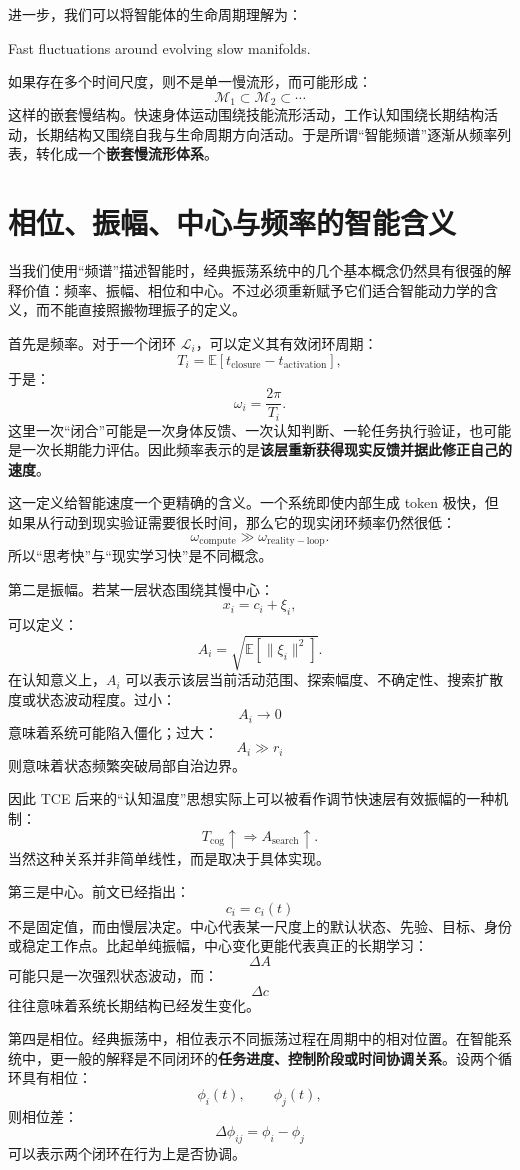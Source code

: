 进一步，我们可以将智能体的生命周期理解为：
\begin{statementbox}
Fast fluctuations around evolving slow manifolds.
\end{statementbox}
如果存在多个时间尺度，则不是单一慢流形，而可能形成：
\[
\mathcal{M}_1
\subset
\mathcal{M}_2
\subset
\cdots
\]
这样的嵌套慢结构。快速身体运动围绕技能流形活动，工作认知围绕长期结构活动，长期结构又围绕自我与生命周期方向活动。于是所谓“智能频谱”逐渐从频率列表，转化成一个\textbf{嵌套慢流形体系}。

\section{相位、振幅、中心与频率的智能含义}

当我们使用“频谱”描述智能时，经典振荡系统中的几个基本概念仍然具有很强的解释价值：频率、振幅、相位和中心。不过必须重新赋予它们适合智能动力学的含义，而不能直接照搬物理振子的定义。

首先是频率。对于一个闭环 $\mathcal{L}_i$，可以定义其有效闭环周期：
\[
T_i
=
\mathbb{E}
[
t_{\mathrm{closure}}
-t_{\mathrm{activation}}
],
\]
于是：
\[
\omega_i
=
\frac{2\pi}{T_i}.
\]
这里一次“闭合”可能是一次身体反馈、一次认知判断、一轮任务执行验证，也可能是一次长期能力评估。因此频率表示的是\textbf{该层重新获得现实反馈并据此修正自己的速度}。

这一定义给智能速度一个更精确的含义。一个系统即使内部生成 token 极快，但如果从行动到现实验证需要很长时间，那么它的现实闭环频率仍然很低：
\[
\omega_{\mathrm{compute}}
\gg
\omega_{\mathrm{reality-loop}}.
\]
所以“思考快”与“现实学习快”是不同概念。

第二是振幅。若某一层状态围绕其慢中心：
\[
x_i
=
c_i+\xi_i,
\]
可以定义：
\[
A_i
=
\sqrt{
\mathbb{E}
[
\|\xi_i\|^2
]
}.
\]
在认知意义上，$A_i$ 可以表示该层当前活动范围、探索幅度、不确定性、搜索扩散度或状态波动程度。过小：
\[
A_i\rightarrow0
\]
意味着系统可能陷入僵化；过大：
\[
A_i\gg r_i
\]
则意味着状态频繁突破局部自治边界。

因此 TCE 后来的“认知温度”思想实际上可以被看作调节快速层有效振幅的一种机制：
\[
T_{\mathrm{cog}}\uparrow
\Rightarrow
A_{\mathrm{search}}\uparrow.
\]
当然这种关系并非简单线性，而是取决于具体实现。

第三是中心。前文已经指出：
\[
c_i=c_i(t)
\]
不是固定值，而由慢层决定。中心代表某一尺度上的默认状态、先验、目标、身份或稳定工作点。比起单纯振幅，中心变化更能代表真正的长期学习：
\[
\Delta A
\]
可能只是一次强烈状态波动，而：
\[
\Delta c
\]
往往意味着系统长期结构已经发生变化。

第四是相位。经典振荡中，相位表示不同振荡过程在周期中的相对位置。在智能系统中，更一般的解释是不同闭环的\textbf{任务进度、控制阶段或时间协调关系}。设两个循环具有相位：
\[
\phi_i(t),\qquad
\phi_j(t),
\]
则相位差：
\[
\Delta\phi_{ij}
=
\phi_i-\phi_j
\]
可以表示两个闭环在行为上是否协调。

